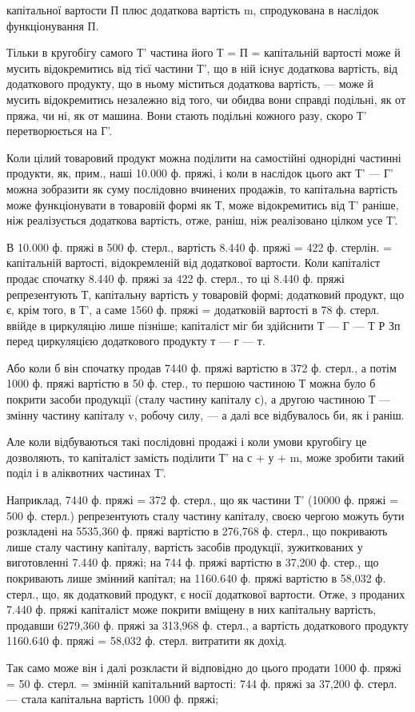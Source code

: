 \parcont{}  %
капітальної вартости П плюс додаткова вартість m, спродукована в
наслідок функціонування П.

Тільки в кругобігу самого Т' частина його Т = П = капітальній вартості
може й мусить відокремитись від тієї частини Т', що в ній існує додаткова
вартість, від додаткового продукту, що в ньому міститься додаткова
вартість, — може й мусить відокремитись незалежно від того, чи обидва
вони справді подільні, як от пряжа, чи ні, як от машина. Вони стають
подільні кожного разу, скоро Т' перетворюється на Г'.

Коли цілий товаровий продукт можна поділити на самостійні однорідні
частинні продукти, як, прим., наші 10.000 ф. пряжі, і коли в
наслідок цього акт Т' — Г' можна зобразити як суму послідовно вчинених
продажів, то капітальна вартість може функціонувати в товаровій
формі як Т, може відокремитись від Т' раніше, ніж реалізується додаткова
вартість, отже, раніш, ніж реалізовано цілком усе Т'.

В 10.000 ф. пряжі в 500 ф. стерл., вартість 8.440 ф. пряжі = 422 ф.
стерлін. = капітальній вартості, відокремленій від додаткової вартости.
Коли капіталіст продає спочатку 8.440 ф. пряжі за 422 ф. стерл., то
ці 8.440 ф. пряжі репрезентують Т, капітальну вартість у товаровій
формі; додатковий продукт, що є, крім того, в Т', а саме 1560 ф.
пряжі = додатковій вартості в 78 ф. стерл. ввійде в циркуляцію лише
пізніше; капіталіст міг би здійснити Т — Г — Т Р Зп перед циркуляцією
додаткового продукту т — г — т.

Або коли б він спочатку продав 7440 ф. пряжі вартістю в 372 ф.
стерл., а потім 1000 ф. пряжі вартістю в 50 ф. стер., то першою частиною
Т можна було б покрити засоби продукції (сталу частину капіталу
с), а другою частиною Т — змінну частину капіталу v, робочу
силу, — а далі все відбувалось би, як і раніш.

Але коли відбуваються такі послідовні продажі і коли умови кругобігу
це дозволяють, то капіталіст замість поділити Т' на с + у + m,
може зробити такий поділ і в аліквотних частинах Т'.

Наприклад, 7440 ф. пряжі = 372 ф. стерл., що як частини Т'
(10000 ф. пряжі = 500 ф. стерл.) репрезентують сталу частину капіталу,
своєю чергою можуть бути розкладені на 5535,360 ф. пряжі вартістю
в 276,768 ф. стерл., що покривають лише сталу частину капіталу, вартість
засобів продукції, зужиткованих у виготовленні 7.440 ф. пряжі; на 744 ф. пряжі
вартістю в 37,200 ф. стер., що покривають лише змінний капітал; на
1160.640 ф. пряжі вартістю в 58,032 ф. стерл., що, як додатковий продукт,
є носії додаткової вартости. Отже, з проданих 7.440 ф. пряжі
капіталіст може покрити вміщену в них капітальну вартість, продавши
6279,360 ф. пряжі за 313,968 ф. стерл., а вартість додаткового продукту
1160.640 ф. пряжі = 58,032 ф. стерл. витратити як дохід.

Так само може він і далі розкласти й відповідно до цього продати
1000 ф. пряжі = 50 ф. стерл. = змінній капітальний вартості: 744 ф.
пряжі за 37,200 ф. стерл. — стала капітальна вартість 1000 ф. пряжі;
\parbreak{}  %
